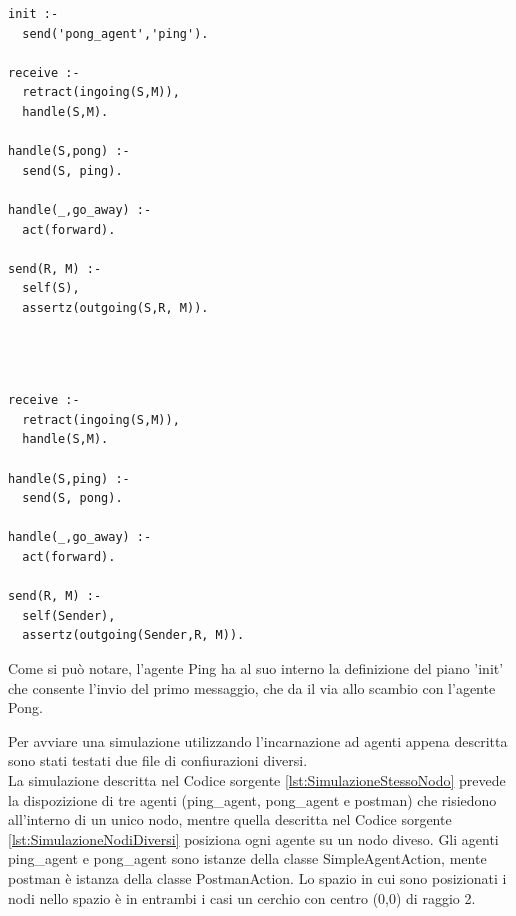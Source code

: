 \documentclass[12pt,a4paper,openright,twoside]{report}
\begin{document}
\bigskip
\medskip
\begin{minipage}{0.45\textwidth}
\begin{lstlisting}[label={lst:PingAgent},caption={Teoria agente Ping}]
init :-
  send('pong_agent','ping').

receive :-
  retract(ingoing(S,M)),
  handle(S,M).

handle(S,pong) :-
  send(S, ping).

handle(_,go_away) :-
  act(forward).

send(R, M) :-
  self(S),
  assertz(outgoing(S,R, M)).
\end{lstlisting}
\end{minipage}
\hfill
\begin{minipage}{0.45\textwidth}
\begin{lstlisting}[label={lst:PongAgent},caption={Teoria agente Pong}]



receive :-
  retract(ingoing(S,M)),
  handle(S,M).

handle(S,ping) :-
  send(S, pong).

handle(_,go_away) :-
  act(forward).

send(R, M) :-
  self(Sender),
  assertz(outgoing(Sender,R, M)).
\end{lstlisting}
\end{minipage}%

\bigskip

Come si pu\`o notare, l'agente Ping ha al suo interno la definizione del piano 'init' che consente l'invio del primo messaggio, che da il via allo scambio con l'agente Pong.

Per avviare una simulazione utilizzando l'incarnazione ad agenti appena descritta sono stati testati due file di confiurazioni diversi.
\\
La simulazione descritta nel Codice sorgente \ref{lst:SimulazioneStessoNodo} prevede la dispozizione di tre agenti (ping\_agent, pong\_agent e postman) che risiedono all'interno di un unico nodo, mentre quella descritta nel Codice sorgente \ref{lst:SimulazioneNodiDiversi} posiziona ogni agente su un nodo diveso. Gli agenti ping\_agent e pong\_agent sono istanze della classe SimpleAgentAction, mente postman \`e istanza della classe PostmanAction. Lo spazio in cui sono posizionati i nodi nello spazio \`e in entrambi i casi un cerchio con centro (0,0) di raggio 2.
\end{document}
